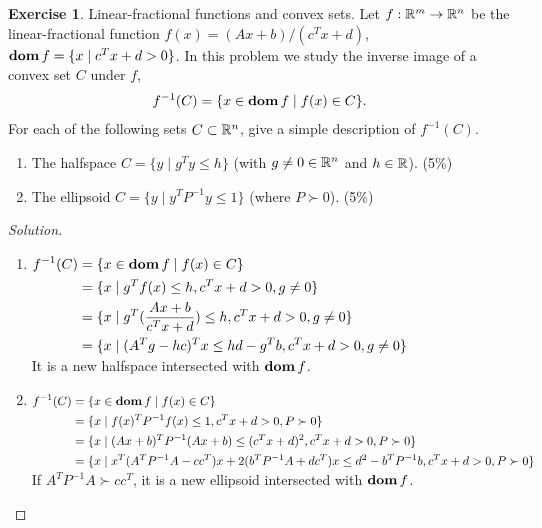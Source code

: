 \documentclass[12pt]{extarticle}
\theoremstyle{definition}
\newtheorem{exercise}{Exercise}
\begin{document}
\begin{exercise}
  Linear-fractional functions and convex sets. Let $f:\mathbb{R}^m\rightarrow\mathbb{R}^n$ be the linear-fractional function $f(x)=(Ax+b)/(c^Tx+d)$,
  $\mathop{\bf dom} f=\{x\mid c^Tx+d>0\}$. In this problem we study the inverse image of a convex set $C$ under $f$, \ie
  \begin{align*}
    f^{-1}(C)=\{x\in\mathop{\bf dom} f\mid f(x) \in C\}.
  \end{align*}
  For each of the following sets $C\subset \mathbb{R}^n$, give a simple description of $f^{-1}(C)$.
  \begin{enumerate}[label=(\alph*)]
    \item The halfspace $C=\{y\mid g^Ty\le h\}$ (with $g\ne 0\in\mathbb{R}^n$ and $h\in\mathbb{R}$). (5\%)
    \item The ellipsoid $C=\{y\mid y^TP^{-1}y\le 1\}$ (where $P\succ0$). (5\%)
  \end{enumerate}
\end{exercise}
\begin{proof}[Solution]
  $ $\let\qed\relax
  \begin{enumerate}[label=(\alph*)]
    \item $\begin{aligned}[t]
              f^{-1}(C)&=\{x\in\mathop{\bf dom} f\mid f(x) \in C\}\\
                       &=\{x\mid g^Tf(x)\le h, c^Tx+d>0, g\ne 0\}\\
                       &=\{x\mid g^T(\frac{Ax+b}{c^Tx+d})\le h, c^Tx+d>0, g\ne 0\}\\
                       &=\{x\mid (A^Tg-hc)^Tx\le hd-g^Tb, c^Tx+d>0, g\ne 0\}
          \end{aligned}$\\
          It is a new halfspace intersected with $\mathop{\bf dom} f$.
    \item $\begin{aligned}[t]
              f^{-1}(C)&=\{x\in\mathop{\bf dom} f\mid f(x) \in C\}\\
                       &=\{x\mid f(x)^TP^{-1}f(x)\le 1, c^Tx+d>0, P\succ 0\}\\
                       &=\{x\mid (Ax+b)^TP^{-1}(Ax+b)\le(c^Tx+d)^2, c^Tx+d>0, P\succ 0\}\\
                       &=\{x\mid x^T(A^TP^{-1}A-cc^T)x+2(b^TP^{-1}A+dc^T)x\le d^2-b^TP^{-1}b,c^Tx+d>0, P\succ 0\}
          \end{aligned}$\\
          If $A^TP^{-1}A\succ cc^T$, it is a new ellipsoid intersected with $\mathop{\bf dom} f$.
  \end{enumerate}
\end{proof}
\end{document}
